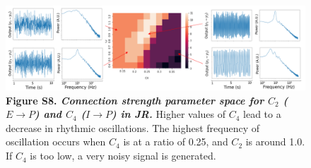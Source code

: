 \documentclass[12pt,twoside]{article}
\begin{document}
\begin{figure}[H]
    \hspace{-1cm}
    \includegraphics[scale=0.7]{Images/JR_Zoom_C2C4_full_new.png}
    \caption*{\textbf{Figure S8. \textit{Connection strength parameter space for $C_{2}$ ($E \rightarrow P$) and $C_{4}$ ($I \rightarrow P$) in JR.}} Higher values of  $C_{4}$ lead to a decrease in rhythmic oscillations. The highest frequency of oscillation occurs when $C_{4}$ is at a ratio of 0.25, and $C_{2}$ is around 1.0. If $C_{4}$ is too low, a very noisy signal is generated.} \label{fig:JR_Czoomed}
\end{figure}



\vspace{1cm}
\end{document}
